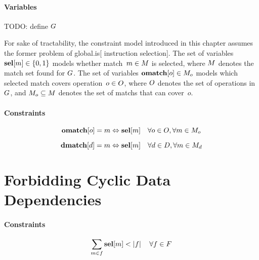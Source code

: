\paragraph{Variables}

TODO: define $G$

For sake of tractability, the constraint model introduced in this chapter
assumes the former problem of \gls{global.is}[ \gls{instruction selection}].
%
The set of \glspl{variable} \mbox{$\mVar{sel}[m] \in \mSet{0, 1}$} models
whether \gls{match}~\mbox{$m \in \mMatchSet$} is selected, where $\mMatchSet$
denotes the match set found for $G$.
%
The set of \glspl{variable} \mbox{$\mVar{omatch}[o] \in \mMatchSet[o]$} models
which selected match covers operation~\mbox{$o \in O$}, where $O$
denotes the set of operations in $G$, and \mbox{$\mMatchSet[o] \subseteq
  \mMatchSet$} denotes the set of \glspl{match} that can cover~$o$.

\paragraph{Constraints}

\begin{equation}
  \mVar{omatch}[o] = m \mEq \mVar{sel}[m]
  \mQuantSep
  \forall o \in \mOpSet,
  \forall m \in \mMatchSet[o]
  \labelEquation{operation-coverage}
\end{equation}

\begin{equation}
  \mVar{dmatch}[d] = m \mEq \mVar{sel}[m]
  \mQuantSep
  \forall d \in \mDataSet,
  \forall m \in \mMatchSet[d]
  \labelEquation{data-definitions}
\end{equation}



\section{Forbidding Cyclic Data Dependencies}

\paragraph{Constraints}

\begin{equation}
  \sum_{m \in f} \mVar{sel}[m] < \mCard{f}
  \mQuantSep
  \forall f \in \mForbiddenCombSet
  \labelEquation{cyclic-data-deps}
\end{equation}
